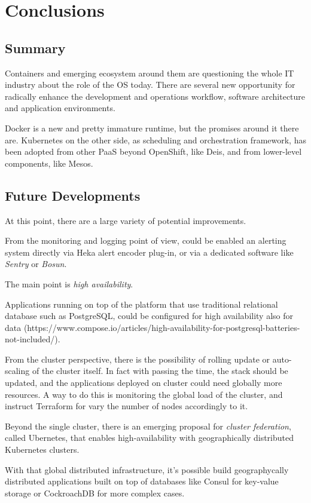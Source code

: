 \chapter{Conclusions}\label{conclusions}

\section{Summary}\label{summary}

Containers and emerging ecosystem around them are questioning the whole
IT industry about the role of the OS today. There are several new
opportunity for radically enhance the development and operations
workflow, software architecture and application environments.

Docker is a new and pretty immature runtime, but the promises around it
there are. Kubernetes on the other side, as scheduling and orchestration
framework, has been adopted from other PaaS beyond OpenShift, like Deis,
and from lower-level components, like Mesos.

\section{Future Developments}\label{future-developments}

At this point, there are a large variety of potential improvements.

From the monitoring and logging point of view, could be enabled an
alerting system directly via Heka alert encoder plug-in, or via a
dedicated software like \emph{Sentry} or \emph{Bosun}.

The main point is \emph{high availability}\cite{HighAvailability}.

Applications running on top of the platform that use traditional
relational database such as PostgreSQL, could be configured for high
availability also for data
(https://www.compose.io/articles/high-availability-for-postgresql-batteries-not-included/).

From the cluster perspective, there is the possibility of rolling update
or auto-scaling of the cluster itself. In fact with passing the time,
the stack should be updated, and the applications deployed on cluster
could need globally more resources. A way to do this is monitoring the
global load of the cluster, and instruct Terraform for vary the number
of nodes accordingly to it.

Beyond the single cluster, there is an emerging proposal for
\emph{cluster federation}, called Ubernetes, that enables
high-availability with geographically distributed Kubernetes clusters.

With that global distributed infrastructure, it's possible build
geographycally distributed applications built on top of databases like
Consul for key-value storage or CockroachDB for more complex cases.